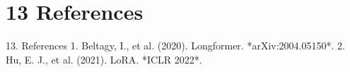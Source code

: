 \section{13 References}

 13. References
1. Beltagy, I., et al. (2020). Longformer. *arXiv:2004.05150*.
2. Hu, E. J., et al. (2021). LoRA. *ICLR 2022*.

